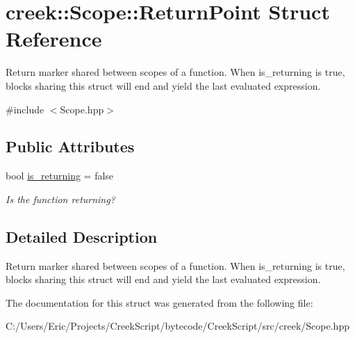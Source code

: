 \hypertarget{structcreek_1_1_scope_1_1_return_point}{}\section{creek\+:\+:Scope\+:\+:Return\+Point Struct Reference}
\label{structcreek_1_1_scope_1_1_return_point}


Return marker shared between scopes of a function. When {\ttfamily is\+\_\+returning} is {\ttfamily true}, blocks sharing this struct will end and yield the last evaluated expression.  




{\ttfamily \#include $<$Scope.\+hpp$>$}

\subsection*{Public Attributes}
\begin{DoxyCompactItemize}
\item 
bool \hyperlink{structcreek_1_1_scope_1_1_return_point_a719f8a6f50d43ece9a3e1b457c161113}{is\+\_\+returning} = false\hypertarget{structcreek_1_1_scope_1_1_return_point_a719f8a6f50d43ece9a3e1b457c161113}{}\label{structcreek_1_1_scope_1_1_return_point_a719f8a6f50d43ece9a3e1b457c161113}

\begin{DoxyCompactList}\small\item\em Is the function returning? \end{DoxyCompactList}\end{DoxyCompactItemize}


\subsection{Detailed Description}
Return marker shared between scopes of a function. When {\ttfamily is\+\_\+returning} is {\ttfamily true}, blocks sharing this struct will end and yield the last evaluated expression. 

The documentation for this struct was generated from the following file\+:\begin{DoxyCompactItemize}
\item 
C\+:/\+Users/\+Eric/\+Projects/\+Creek\+Script/bytecode/\+Creek\+Script/src/creek/Scope.\+hpp\end{DoxyCompactItemize}
